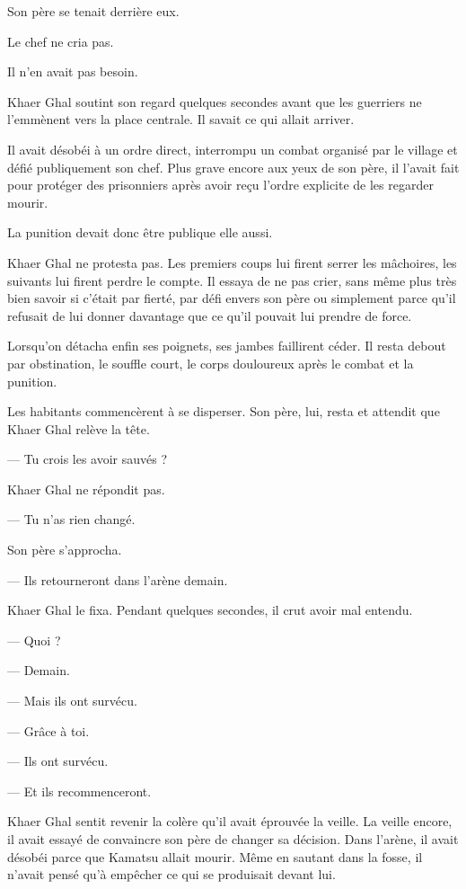 Son père se tenait derrière eux.

Le chef ne cria pas.

Il n'en avait pas besoin.

Khaer Ghal soutint son regard quelques secondes avant que les guerriers ne
l'emmènent vers la place centrale. Il savait ce qui allait arriver.

Il avait désobéi à un ordre direct, interrompu un combat organisé par le
village et défié publiquement son chef. Plus grave encore aux yeux de son père,
il l'avait fait pour protéger des prisonniers après avoir reçu l'ordre
explicite de les regarder mourir.

La punition devait donc être publique elle aussi.

Khaer Ghal ne protesta pas. Les premiers coups lui firent serrer les mâchoires,
les suivants lui firent perdre le compte. Il essaya de ne pas crier, sans même
plus très bien savoir si c'était par fierté, par défi envers son père ou
simplement parce qu'il refusait de lui donner davantage que ce qu'il pouvait
lui prendre de force.

Lorsqu'on détacha enfin ses poignets, ses jambes faillirent céder. Il resta
debout par obstination, le souffle court, le corps douloureux après le combat
et la punition.

Les habitants commencèrent à se disperser. Son père, lui, resta et attendit que
Khaer Ghal relève la tête.

— Tu crois les avoir sauvés ?

Khaer Ghal ne répondit pas.

— Tu n'as rien changé.

Son père s'approcha.

— Ils retourneront dans l'arène demain.

Khaer Ghal le fixa. Pendant quelques secondes, il crut avoir mal entendu.

— Quoi ?

— Demain.

— Mais ils ont survécu.

— Grâce à toi.

— Ils ont survécu.

— Et ils recommenceront.

Khaer Ghal sentit revenir la colère qu'il avait éprouvée la veille. La veille
encore, il avait essayé de convaincre son père de changer sa décision. Dans
l'arène, il avait désobéi parce que Kamatsu allait mourir. Même en sautant dans
la fosse, il n'avait pensé qu'à empêcher ce qui se produisait devant lui.


